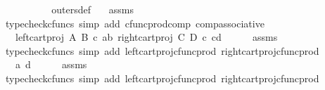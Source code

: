 \begin{isabellebody}
\ \ \ \ {\isasymrangle}{\isachardoublequoteclose}\isanewline
\ \ \ \ \isamarkupfalse%
\ outers{\isacharunderscore}{\kern0pt}def\ \ \isamarkupfalse%
\ assms\ \isamarkupfalse%
\ {\isacharparenleft}{\kern0pt}typecheck{\isacharunderscore}{\kern0pt}cfuncs{\isacharcomma}{\kern0pt}\ simp\ add{\isacharcolon}{\kern0pt}\ cfunc{\isacharunderscore}{\kern0pt}prod{\isacharunderscore}{\kern0pt}comp\ comp{\isacharunderscore}{\kern0pt}associative{}{\isacharparenright}{\kern0pt}\isanewline
\ \ \isamarkupfalse%
\ \isamarkupfalse%
\ {\isachardoublequoteopen}{\isachardot}{\kern0pt}{\isachardot}{\kern0pt}{\isachardot}{\kern0pt}\ {\isacharequal}{\kern0pt}\ {\isasymlangle}left{\isacharunderscore}{\kern0pt}cart{\isacharunderscore}{\kern0pt}proj\ A\ B\ {\isasymcirc}\isactrlsub c\ {\isasymlangle}a{\isacharcomma}{\kern0pt}b{\isasymrangle}{\isacharcomma}{\kern0pt}\ right{\isacharunderscore}{\kern0pt}cart{\isacharunderscore}{\kern0pt}proj\ C\ D\ {\isasymcirc}\isactrlsub c\ {\isasymlangle}c{\isacharcomma}{\kern0pt}d{\isasymrangle}{\isasymrangle}{\isachardoublequoteclose}\isanewline
\ \ \ \ \isamarkupfalse%
\ assms\ \isamarkupfalse%
\ {\isacharparenleft}{\kern0pt}typecheck{\isacharunderscore}{\kern0pt}cfuncs{\isacharcomma}{\kern0pt}\ simp\ add{\isacharcolon}{\kern0pt}\ left{\isacharunderscore}{\kern0pt}cart{\isacharunderscore}{\kern0pt}proj{\isacharunderscore}{\kern0pt}cfunc{\isacharunderscore}{\kern0pt}prod\ right{\isacharunderscore}{\kern0pt}cart{\isacharunderscore}{\kern0pt}proj{\isacharunderscore}{\kern0pt}cfunc{\isacharunderscore}{\kern0pt}prod{\isacharparenright}{\kern0pt}\isanewline
\ \ \isamarkupfalse%
\ \isamarkupfalse%
\ {\isachardoublequoteopen}{\isachardot}{\kern0pt}{\isachardot}{\kern0pt}{\isachardot}{\kern0pt}\ {\isacharequal}{\kern0pt}\ {\isasymlangle}a{\isacharcomma}{\kern0pt}\ d{\isasymrangle}{\isachardoublequoteclose}\isanewline
\ \ \ \ \isamarkupfalse%
\ assms\ \isamarkupfalse%
\ {\isacharparenleft}{\kern0pt}typecheck{\isacharunderscore}{\kern0pt}cfuncs{\isacharcomma}{\kern0pt}\ simp\ add{\isacharcolon}{\kern0pt}\ left{\isacharunderscore}{\kern0pt}cart{\isacharunderscore}{\kern0pt}proj{\isacharunderscore}{\kern0pt}cfunc{\isacharunderscore}{\kern0pt}prod\ right{\isacharunderscore}{\kern0pt}cart{\isacharunderscore}{\kern0pt}proj{\isacharunderscore}{\kern0pt}cfunc{\isacharunderscore}{\kern0pt}prod{\isacharparenright}{\kern0pt}\isanewline
\ \ \isamarkupfalse%

\end{isabellebody}
